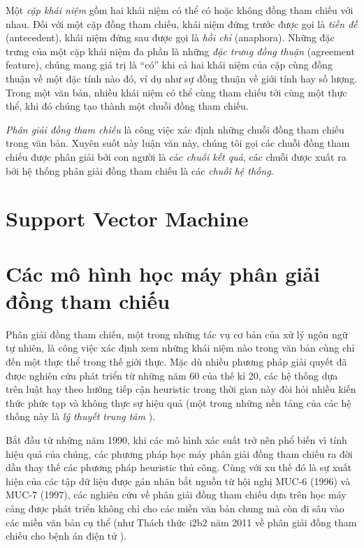Một \emph{cặp khái niệm} gồm hai khái niệm có thể có hoặc không đồng tham chiếu với nhau. Đối với một cặp đồng tham chiếu, khái niệm đứng trước được gọi là \emph{tiền đề} (antecedent), khái niệm đứng sau được gọi là \emph{hồi chỉ} (anaphora). Những đặc trưng của một cặp khái niệm đa phần là những \emph{đặc trưng đồng thuận} (agreement feature), chúng mang giá trị là ``có'' khi cả hai khái niệm của cặp cùng đồng thuận về một đặc tính nào đó, ví dụ như sự đồng thuận về giới tính hay số lượng. Trong một văn bản, nhiều khái niệm có thể cùng tham chiếu tới cùng một thực thể, khi đó chúng tạo thành một chuỗi đồng tham chiếu.

\emph{Phân giải đồng tham chiếu} là công việc xác định những chuỗi đồng tham chiếu trong văn bản. Xuyên suốt này luận văn này, chúng tôi gọi các chuỗi đồng tham chiếu được phân giải bởi con người là các \emph{chuỗi kết quả}, các chuỗi được xuất ra bởi hệ thống phân giải đồng tham chiếu là các \emph{chuỗi hệ thống}.

\section{Support Vector Machine}
\section{Các mô hình học máy phân giải đồng tham chiếu}
Phân giải đồng tham chiếu, một trong những tác vụ cơ bản của xử lý ngôn ngữ tự nhiên, là công việc xác định xem những khái niệm nào trong văn bản cùng chỉ đến một thực thể trong thế giới thực. Mặc dù nhiều phương pháp giải quyết đã được nghiên cứu phát triển từ những năm 60 của thế kỉ 20, các hệ thống dựa trên luật hay theo hướng tiếp cận heuristic trong thời gian này đòi hỏi nhiều kiến thức phức tạp và không thực sự hiệu quả (một trong những nền tảng của các hệ thống này là \emph{lý thuyết trung tâm} \cite{Grosz1983}).

Bắt đầu từ những năm 1990, khi các mô hình xác suất trở nên phổ biến vì tính hiệu quả của chúng, các phương pháp học máy phân giải đồng tham chiếu ra đời dần thay thế các phương pháp heuristic thủ công. Cùng với xu thế đó là sự xuất hiện của các tập dữ liệu được gán nhãn bắt nguồn từ hội nghị MUC-6 (1996) và MUC-7 (1997), các nghiên cứu về phân giải đồng tham chiếu dựa trên học máy càng được phát triển không chỉ cho các miền văn bản chung mà còn đi sâu vào các miền văn bản cụ thể (như Thách thức i2b2 năm 2011 về phân giải đồng tham chiếu cho bệnh án điện tử \cite{OzlemUzuner2012}).


